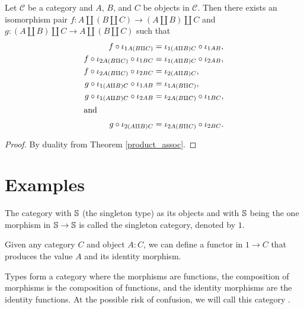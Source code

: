 \documentclass[../../math.tex]{subfiles}
\begin{document}
\begin{theorem} \label{coproduct_assoc}
    Let $\mathcal C$ be a category and $A$, $B$, and $C$ be objects in $\mathcal
    C$.  Then there exists an isomorphism pair $f : A \amalg (B \amalg C) \to (A
    \amalg B) \amalg C$ and $g : (A \amalg B) \amalg C \to A \amalg (B \amalg
    C)$ such that
    \begin{align*}
        f \circ \iota_{1A(B \amalg C)}
            &= \iota_{1(A \amalg B)C} \circ \iota_{1AB}, \\
        f \circ \iota_{2A(B \amalg C)} \circ \iota_{1BC}
            &= \iota_{1(A \amalg B)C} \circ \iota_{2AB}, \\
        f \circ \iota_{2A(B \amalg C)} \circ \iota_{2BC}
            &= \iota_{2(A \amalg B)C}, \\
        g \circ \iota_{1(A \amalg B)C} \circ \iota_{1AB}
            &= \iota_{1A(B \amalg C)}, \\
        g \circ \iota_{1(A \amalg B)C} \circ \iota_{2AB}
            &= \iota_{2A(B \amalg C)} \circ \iota_{1BC}, \\
    \intertext{and}
        g \circ \iota_{2(A \amalg B)C}
            &= \iota_{2A(B \amalg C)} \circ \iota_{2BC}.
    \end{align*}
\end{theorem}
\begin{proof}
    By duality from Theorem \ref{product_assoc}.
\end{proof}

\section{Examples}

\begin{definition}
    The category with $\S$ (the singleton type) as its objects and with $\S$
    being the one morphism in $\S \to \S$ is called the singleton category,
    denoted by $1$.
\end{definition}

\begin{definition}
    Given any category $C$ and object $A : C$, we can define a functor in $1 \to
    C$ that produces the value $A$ and its identity morphism.
\end{definition}

\begin{definition}
    Types form a category where the morphisms are functions, the composition of
    morphisms is the composition of functions, and the identity morphisms are
    the identity functions.  At the possible risk of confusion, we will call
    this category \Type.
\end{definition}
\end{document}
